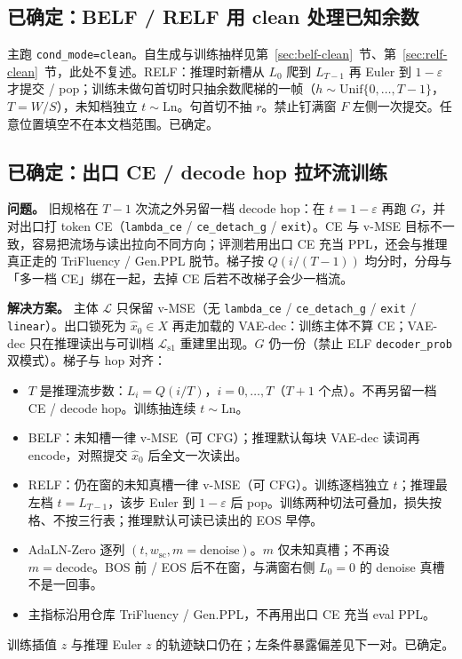 \documentclass[UTF8,a4paper,11pt]{ctexart}
\begin{document}
\subsection{已确定：BELF / RELF 用 clean 处理已知余数}

主跑 \texttt{cond\_mode=clean}。自生成与训练抽样见第~\ref{sec:belf-clean}~节、第~\ref{sec:relf-clean}~节，此处不复述。RELF：推理时新槽从 \(L_0\) 爬到 \(L_{T-1}\) 再 Euler 到 \(1-\varepsilon\) 才提交 / pop；训练未做句首切时只抽余数爬梯的一帧（\(h\sim\mathrm{Unif}\{0,\ldots,T-1\}\)，\(T=W/S\)），未知档独立 \(t\sim\mathrm{Ln}\)。句首切不抽 \(r\)。禁止钉满窗 \(F\) 左侧一次提交。任意位置填空不在本文档范围。已确定。

\subsection{已确定：出口 CE / decode hop 拉坏流训练}

\textbf{问题。}
旧规格在 \(T-1\) 次流之外另留一档 decode hop：在 \(t=1-\varepsilon\) 再跑 \(G\)，并对出口打 token CE（\texttt{lambda\_ce} / \texttt{ce\_detach\_g} / \texttt{exit}）。CE 与 v-MSE 目标不一致，容易把流场与读出拉向不同方向；评测若用出口 CE 充当 PPL，还会与推理真正走的 TriFluency / Gen.PPL 脱节。梯子按 \(Q(i/(T-1))\) 均分时，分母与「多一档 CE」绑在一起，去掉 CE 后若不改梯子会少一档流。

\textbf{解决方案。}
主体 \(\mathcal{L}\) 只保留 v-MSE（无 \texttt{lambda\_ce} / \texttt{ce\_detach\_g} / \texttt{exit} / \texttt{linear}）。出口锁死为 \(\hat x_0\in X\) 再走加载的 VAE-dec：训练主体不算 CE；VAE-dec 只在推理读出与可训档 \(\mathcal{L}_{\mathrm{s1}}\) 重建里出现。\(G\) 仍一份（禁止 ELF \texttt{decoder\_prob} 双模式）。梯子与 hop 对齐：
\begin{itemize}
  \item \(T\) 是推理流步数：\(L_i=Q(i/T)\)，\(i=0,\ldots,T\)（\(T+1\) 个点）。不再另留一档 CE / decode hop。训练抽连续 \(t\sim\mathrm{Ln}\)。
  \item BELF：未知槽一律 v-MSE（可 CFG）；推理默认每块 VAE-dec 读词再 encode，对照提交 \(\hat x_0\) 后全文一次读出。
  \item RELF：仍在窗的未知真槽一律 v-MSE（可 CFG）。训练逐档独立 \(t\)；推理最左档 \(t=L_{T-1}\)，该步 Euler 到 \(1-\varepsilon\) 后 pop。训练两种切法可叠加，损失按格、不按三行表；推理默认可读已读出的 EOS 早停。
  \item AdaLN-Zero 逐列 \((t,w_{\mathrm{sc}},m=\mathrm{denoise})\)。\(m\) 仅未知真槽；不再设 \(m=\mathrm{decode}\)。BOS 前 / EOS 后不在窗，与满窗右侧 \(L_0=0\) 的 denoise 真槽不是一回事。
  \item 主指标沿用仓库 TriFluency / Gen.PPL，不再用出口 CE 充当 eval PPL。
\end{itemize}
训练插值 \(z\) 与推理 Euler \(z\) 的轨迹缺口仍在；左条件暴露偏差见下一对。已确定。
\end{document}
